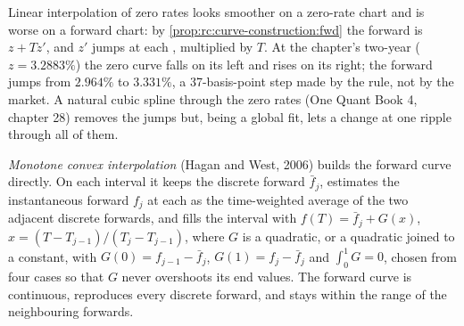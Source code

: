 Linear interpolation of zero rates looks smoother on a zero-rate chart and is
worse on a forward chart: by \cref{prop:rc:curve-construction:fwd} the forward
is $z + Tz'$, and $z'$ jumps at each , multiplied by $T$. At the
chapter's two-year  ($z = 3.2883\%$) the zero curve falls on its left
and rises on its right; the forward jumps from $2.964\%$ to $3.331\%$, a
37-basis-point step made by the rule, not by the market. A natural cubic
spline through the zero rates (One Quant Book 4, chapter 28) removes the
jumps but, being a global fit, lets a change at one  ripple through
all of them.

\begin{definition}\label{def:rc:curve-construction:monotone}
\emph{Monotone convex interpolation}
(Hagan and West, 2006) builds the forward curve directly. On each interval
it keeps the discrete forward $\bar f_j$, estimates the instantaneous forward
$f_j$ at each  as the time-weighted average of the two adjacent discrete
forwards, and fills the interval with $f(T)=\bar f_j + G(x)$,
$x=(T-T_{j-1})/(T_j-T_{j-1})$, where $G$ is a quadratic, or a quadratic joined
to a constant, with $G(0)=f_{j-1}-\bar f_j$, $G(1)=f_j-\bar f_j$ and
$\int_0^1G=0$, chosen from four cases so that $G$ never overshoots its end
values. The forward curve is continuous, reproduces every discrete forward,
and stays within the range of the neighbouring forwards.
\end{definition}

\label{lst:rc:curve-construction:mc}

